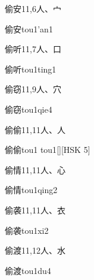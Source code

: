 \begin{entry}{偷安}{11,6}{⼈、⼧}
  \begin{phonetics}{偷安}{tou1'an1}
  \end{phonetics}
\end{entry}

\begin{entry}{偷听}{11,7}{⼈、⼝}
  \begin{phonetics}{偷听}{tou1ting1}
  \end{phonetics}
\end{entry}

\begin{entry}{偷窃}{11,9}{⼈、⽳}
  \begin{phonetics}{偷窃}{tou1qie4}
  \end{phonetics}
\end{entry}

\begin{entry}{偷偷}{11,11}{⼈、⼈}
  \begin{phonetics}{偷偷}{tou1 tou1}[][HSK 5]
  \end{phonetics}
\end{entry}

\begin{entry}{偷情}{11,11}{⼈、⼼}
  \begin{phonetics}{偷情}{tou1qing2}
  \end{phonetics}
\end{entry}

\begin{entry}{偷袭}{11,11}{⼈、⾐}
  \begin{phonetics}{偷袭}{tou1xi2}
  \end{phonetics}
\end{entry}

\begin{entry}{偷渡}{11,12}{⼈、⽔}
  \begin{phonetics}{偷渡}{tou1du4}
  \end{phonetics}
\end{entry}

